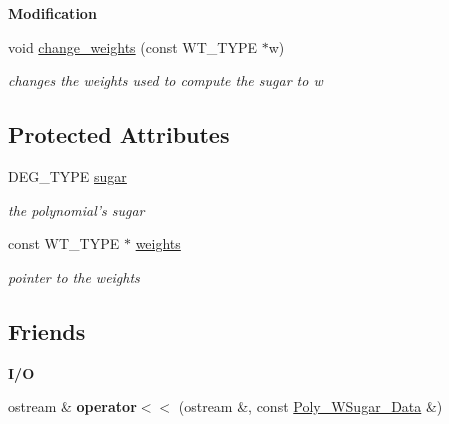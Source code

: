 \begin{Indent}\textbf{ Modification}\par
\begin{DoxyCompactItemize}
\item 
\mbox{\label{class_poly___w_sugar___data_aa8fbd9cf3d9e391a9db0ececdabea03f}} 
void \hyperlink{class_poly___w_sugar___data_aa8fbd9cf3d9e391a9db0ececdabea03f}{change\+\_\+weights} (const W\+T\+\_\+\+T\+Y\+PE $\ast$w)
\begin{DoxyCompactList}\small\item\em changes the weights used to compute the sugar to {\ttfamily w} \end{DoxyCompactList}\end{DoxyCompactItemize}
\end{Indent}
\subsection*{Protected Attributes}
\begin{DoxyCompactItemize}
\item 
\mbox{\label{class_poly___w_sugar___data_a8a3f679ee5536587a4794a8c20b92cb9}} 
D\+E\+G\+\_\+\+T\+Y\+PE \hyperlink{class_poly___w_sugar___data_a8a3f679ee5536587a4794a8c20b92cb9}{sugar}
\begin{DoxyCompactList}\small\item\em the polynomial's sugar \end{DoxyCompactList}\item 
\mbox{\label{class_poly___w_sugar___data_acbe98e7f937ab0c074a732becdd8c619}} 
const W\+T\+\_\+\+T\+Y\+PE $\ast$ \hyperlink{class_poly___w_sugar___data_acbe98e7f937ab0c074a732becdd8c619}{weights}
\begin{DoxyCompactList}\small\item\em pointer to the weights \end{DoxyCompactList}\end{DoxyCompactItemize}
\subsection*{Friends}
\begin{Indent}\textbf{ I/O}\par
\begin{DoxyCompactItemize}
\item 
\mbox{\label{class_poly___w_sugar___data_aaa672dbee5334fe3b57404502489f800}} 
ostream \& {\bfseries operator$<$$<$} (ostream \&, const \hyperlink{class_poly___w_sugar___data}{Poly\+\_\+\+W\+Sugar\+\_\+\+Data} \&)
\end{DoxyCompactItemize}
\end{Indent}


